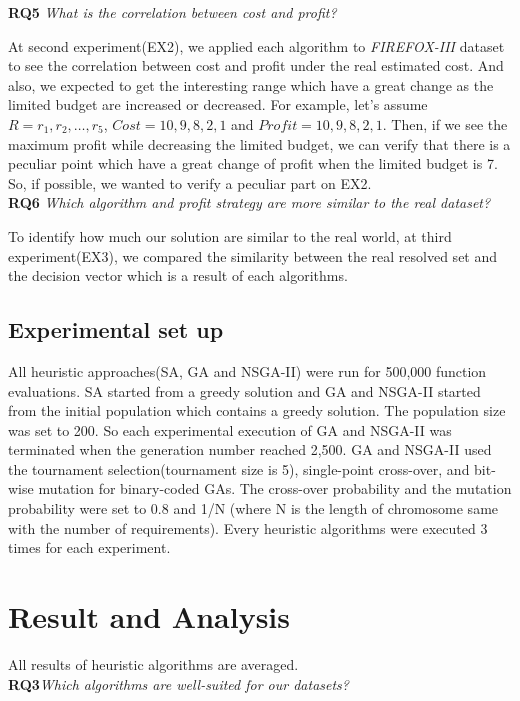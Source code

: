 \textbf{RQ5} \textit{What is the correlation between cost and profit?}

At second experiment(EX2), we applied each algorithm to \textit{FIREFOX-III} dataset to see the correlation between cost and profit under the real estimated cost. And also, we expected to get the interesting range which have a great change as the limited budget are increased or decreased. For example, let's assume $R = {r_1, r_2, \ldots, r_5}$, $Cost = {10, 9, 8, 2, 1}$ and $Profit = {10, 9, 8, 2, 1}$. Then, if we see the maximum profit while decreasing the limited budget, we can verify that there is a peculiar point which have a great change of profit when the limited budget is 7. So, if possible, we wanted to verify a peculiar part on EX2.
\\

\textbf{RQ6} \textit{Which algorithm and profit strategy are more similar to the real dataset?}

To identify how much our solution are similar to the real world, at third experiment(EX3), we compared the similarity between the real resolved set and the decision vector which is a result of each algorithms.

\subsection{Experimental set up}
All heuristic approaches(SA, GA and NSGA-II) were run for 500,000 function evaluations. SA started from a greedy solution and GA and NSGA-II started from the initial population which contains a greedy solution. The population size was set to 200. So each experimental execution of GA and NSGA-II was terminated when the generation number reached 2,500. GA and NSGA-II used the tournament selection(tournament size is 5), single-point cross-over, and bit-wise mutation for binary-coded GAs. The cross-over probability and the mutation probability were set to 0.8 and 1/N (where N is the length of chromosome same with the number of requirements). Every heuristic algorithms were executed 3 times for each experiment.



\section{Result and Analysis}
All results of heuristic algorithms are averaged.\\

\textbf{RQ3}\textit{Which algorithms are well-suited for our datasets?}

